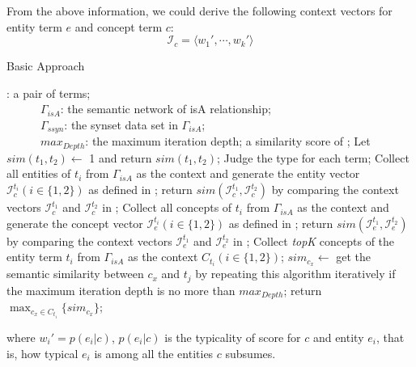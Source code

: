 From the above information, we could derive the following context vectors for entity term $e$ and concept term $c$:
\begin{equation}
\label{eq:Ic}
  \mathcal{I}_c = \langle w_1',\cdots,w_k' \rangle
\end{equation}
\renewcommand\algorithmicrequire{\textbf{Input:}}
\renewcommand\algorithmicensure {\textbf{Output:}}
\begin{algorithm}[!t]
\caption{Basic Approach}
\label{alg:baseline}
\begin{algorithmic}[1]
\REQUIRE {}: a pair of terms;\\
~~~~~~$\Gamma_{isA}$: the semantic network of isA relationship;\\
~~~~~~$\Gamma_{ssyn}$: the synset data set in $\Gamma_{isA}$;\\
~~~~~~$max_{Depth}$: the maximum iteration depth;
\ENSURE a similarity score of ;
\STATE Let $sim(t_1, t_2) \leftarrow $ 1 and return $sim(t_1, t_2)$;
\ENDIF
\STATE Judge the type for each term;
\STATE Collect all entities of $t_i$ from $\Gamma_{isA}$ as the context and generate the entity vector $\mathcal{I}_c^{t_i}(i\in\{1, 2\})$ as defined in ;
\STATE return $sim(\mathcal{I}_c^{t_1}, \mathcal{I}_c^{t_2})$ by comparing the context vectors $\mathcal{I}_c^{t_1}$ and $\mathcal{I}_c^{t_2}$ in ;
\ENDIF
{}
\STATE Collect all concepts of $t_i$ from $\Gamma_{isA}$ as the context and generate the concept vector $\mathcal{I}_e^{t_i}(i\in\{1, 2\})$ as defined in ;
\STATE return $sim(\mathcal{I}_e^{t_1}, \mathcal{I}_e^{t_2})$ by comparing the context vectors $\mathcal{I}_e^{t_1}$ and $\mathcal{I}_e^{t_2}$ in ;
\ENDIF
{}
\STATE Collect \emph{topK} concepts of the entity term $t_i$ from $\Gamma_{isA}$ as the context $C_{t_i} (i\in\{1, 2\})$;
\STATE $sim_{c_x}\leftarrow$ get the semantic similarity between $c_x$ and $t_j$ by repeating this algorithm iteratively if the maximum iteration depth is no more than $max_{Depth}$;%
\ENDFOR
\STATE return $\max_{c_x\in C_{t_i}}\{sim_{c_x}\}$;
\ENDIF
\end{algorithmic}
\end{algorithm}
{\noindent where $w_i' = p(e_i|c)$, $p(e_i|c)$ is the
typicality of score for $c$ and entity $e_i$, that is, how typical
$e_i$ is among all the entities $c$ subsumes.}

